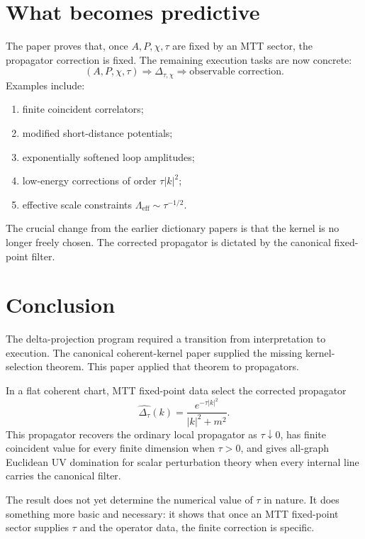 \documentclass[11pt]{article}
\begin{document}
\section{What becomes predictive}

The paper proves that, once \(A,P,\chi,\tau\) are fixed by an MTT sector, the propagator correction is fixed. The remaining execution tasks are now concrete:
\[
        (A,P,\chi,\tau)
        \Longrightarrow
        \Delta_{\tau,\chi}
        \Longrightarrow
        \text{observable correction}.
\]
Examples include:
\begin{enumerate}
\item finite coincident correlators;
\item modified short-distance potentials;
\item exponentially softened loop amplitudes;
\item low-energy corrections of order \(\tau |k|^2\);
\item effective scale constraints \(\Lambda_{\mathrm{eff}}\sim\tau^{-1/2}\).
\end{enumerate}

The crucial change from the earlier dictionary papers is that the kernel is no longer freely chosen. The corrected propagator is dictated by the canonical fixed-point filter.

\section{Conclusion}

The delta-projection program required a transition from interpretation to execution. The canonical coherent-kernel paper supplied the missing kernel-selection theorem. This paper applied that theorem to propagators.

In a flat coherent chart, MTT fixed-point data select the corrected propagator
\[
        \widehat{\Delta_\tau}(k)
        =
        \frac{e^{-\tau |k|^2}}{|k|^2+m^2}.
\]
This propagator recovers the ordinary local propagator as \(\tau\downarrow0\), has finite coincident value for every finite dimension when \(\tau>0\), and gives all-graph Euclidean UV domination for scalar perturbation theory when every internal line carries the canonical filter.

The result does not yet determine the numerical value of \(\tau\) in nature. It does something more basic and necessary: it shows that once an MTT fixed-point sector supplies \(\tau\) and the operator data, the finite correction is specific.
\end{document}
